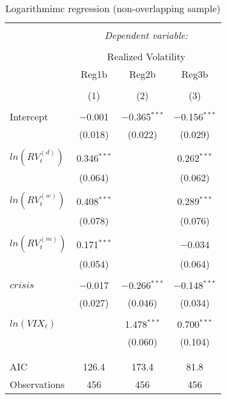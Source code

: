 
\begin{table}[!htbp] \centering 
\begin{threeparttable}
  \caption{Logarithmimc regression (non-overlapping sample)} 
  \label{tab:overlap2} 
\begin{tabular}{@{\extracolsep{5pt}}lccc} 
\\[-1.8ex]\hline 
\hline \\[-1.8ex] 
 & \multicolumn{3}{c}{\textit{Dependent variable:}} \\ 
\cline{2-4} 
\\[-1.8ex] & \multicolumn{3}{c}{Realized Volatility} \\ 
 & Reg1b & Reg2b & Reg3b \\ 
\\[-1.8ex] & (1) & (2) & (3)\\ 
\hline \\[-1.8ex] 
 Intercept & $-$0.001 & $-$0.365$^{***}$ & $-$0.156$^{***}$ \\ 
  & (0.018) & (0.022) & (0.029) \\ 
  & & & \\ 
 $ln(RV^{(d)}_{t})$ & 0.346$^{***}$ &  & 0.262$^{***}$ \\ 
  & (0.064) &  & (0.062) \\ 
  & & & \\ 
 $ln(RV^{(w)}_{t})$ & 0.408$^{***}$ &  & 0.289$^{***}$ \\ 
  & (0.078) &  & (0.076) \\ 
  & & & \\ 
 $ ln(RV^{(m)}_{t})$ & 0.171$^{***}$ &  & $-$0.034 \\ 
  & (0.054) &  & (0.064) \\ 
  & & & \\ 
 $crisis$ & $-$0.017 & $-$0.266$^{***}$ & $-$0.148$^{***}$ \\ 
  & (0.027) & (0.046) & (0.034) \\ 
  & & & \\ 
 $ln(VIX_{t})$ &  & 1.478$^{***}$ & 0.700$^{***}$ \\ 
  &  & (0.060) & (0.104) \\ 
  & & & \\ 
\hline \\[-1.8ex] 
AIC & 126.4 & 173.4 & 81.8 \\ 
Observations & 456 & 456 & 456 \\ 

\end{tabular}
\end{threeparttable}
\end{table}
